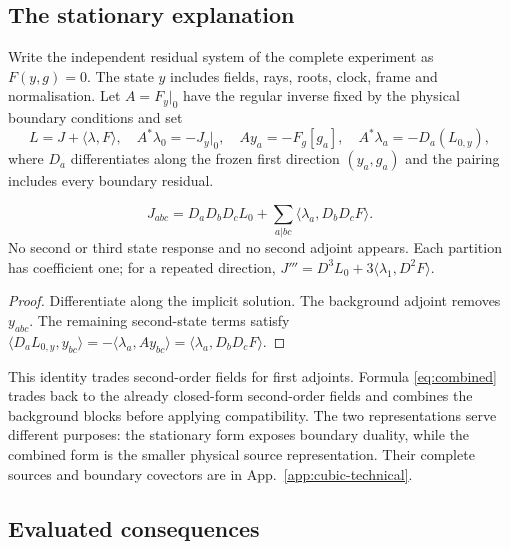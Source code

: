 \subsection{The stationary explanation}
Write the independent residual system of the complete experiment as $F(y,g)=0$.
The state $y$ includes fields, rays, roots, clock, frame and normalisation. Let
$A=F_y|_0$ have the regular inverse fixed by the physical boundary conditions and set
\[
 L=J+\langle\lambda,F\rangle,\quad A^*\lambda_0=-J_y|_0,\quad
 Ay_a=-F_g[g_a],\quad A^*\lambda_a=-D_a(L_{0,y}),
\]
where $D_a$ differentiates along the frozen first direction $(y_a,g_a)$ and the pairing
includes every boundary residual.
\begin{proposition}\label{prop:stationary}
\begin{equation}\label{eq:stationary-polarised}
 \boxed{J_{abc}=D_aD_bD_cL_0+\sum_{a|bc}\langle\lambda_a,D_bD_cF\rangle.}
\end{equation}
No second or third state response and no second adjoint appears. Each partition has
coefficient one; for a repeated direction, $J'''=D^3L_0+3\langle\lambda_1,D^2F\rangle$.
\end{proposition}
\begin{proof}
Differentiate along the implicit solution. The background adjoint removes $y_{abc}$.
The remaining second-state terms satisfy
$\langle D_aL_{0,y},y_{bc}\rangle=-\langle\lambda_a,Ay_{bc}\rangle
=\langle\lambda_a,D_bD_cF\rangle$.
\end{proof}
This identity trades second-order fields for first adjoints. Formula \eqref{eq:combined}
trades back to the already closed-form second-order fields and combines the background
blocks before applying compatibility. The two representations serve different purposes:
the stationary form exposes boundary duality, while the combined form is the smaller
physical source representation. Their complete sources and boundary covectors are in
App.~\ref{app:cubic-technical}.

\subsection{Evaluated consequences}\label{sec:stationary-evaluated}
